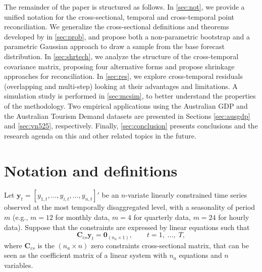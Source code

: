 \documentclass[a4paper,11pt]{article}
\newcommand{\yvet}{\bm{y}}
\newcommand{\Cvet}{\bm{C}}
\newcommand{\Zerovet}{\bm{0}}
\theoremstyle{definition}
\begin{document}
The remainder of the paper is structured as follows.
In \autoref{sec:not}, we provide a unified notation for the cross-sectional, temporal and cross-temporal point reconciliation.
We generalize the cross-sectional definitions and theorems developed by \cite{panagiotelis2023} in \autoref{sec:prob}, and propose both a non-parametric bootstrap and a parametric Gaussian approach to draw a sample from the base forecast distribution.
In \autoref{sec:shrtech}, we analyze the structure of the cross-temporal covariance matrix, proposing four alternative forms and propose shrinkage approaches for reconciliation.
In \autoref{sec:res}, we explore cross-temporal residuals (overlapping and multi-step) looking at their advantages and limitations.
A simulation study is performed in \autoref{sec:mcsim}, to better understand the properties of the methodology.
Two empirical applications using the Australian GDP and the Australian Tourism Demand datasets are presented in Sections \ref{sec:ausgdp} and \ref{sec:vn525}, respectively.
Finally, \autoref{sec:conclusion} presents conclusions and the research agenda on this and other related topics in the future.

\section{Notation and definitions}\label{sec:not}


Let $\yvet_t = [y_{1,t},\dots,y_{i,t},\dots,y_{n,t}]'$ be an $n$-variate linearly constrained time series observed at the most temporally disaggregated level, with a seasonality of period $m$ (e.g., $m = 12$ for monthly data, $m = 4$ for quarterly data, $m = 24$ for hourly data). Suppose that the constraints are expressed by linear equations such that \citep{difonzo2023}
\begin{equation}
	\label{eq:cs_con}
	\Cvet_{cs}\yvet_t = \Zerovet_{(n_a \times 1)}, \qquad t = 1, \;\dots, \;T,
\end{equation}
where $\Cvet_{cs}$ is the $(n_a \times n)$ zero constraints cross-sectional matrix, that can be seen as the coefficient matrix of a linear system with $n_a$ equations and $n$ variables.


\end{document}
